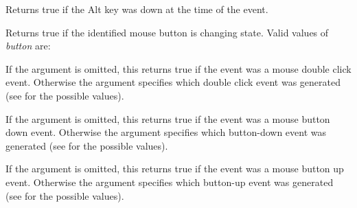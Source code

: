 \label{wxmouseeventaltdown}


Returns true if the Alt key was down at the time of the event.


\label{wxmouseeventbutton}


Returns true if the identified mouse button is changing state. Valid
values of {\it button} are:

\begin{twocollist}\itemsep=0pt
\end{twocollist}


\label{wxmouseeventbuttondclick}


If the argument is omitted, this returns true if the event was a mouse
double click event. Otherwise the argument specifies which double click event
was generated (see  for the possible
values).


\label{wxmouseeventbuttondown}


If the argument is omitted, this returns true if the event was a mouse
button down event. Otherwise the argument specifies which button-down event
was generated (see  for the possible
values).



\label{wxmouseeventbuttonup}


If the argument is omitted, this returns true if the event was a mouse
button up event. Otherwise the argument specifies which button-up event
was generated (see  for the possible
values).



\label{wxmouseeventcmddown}

